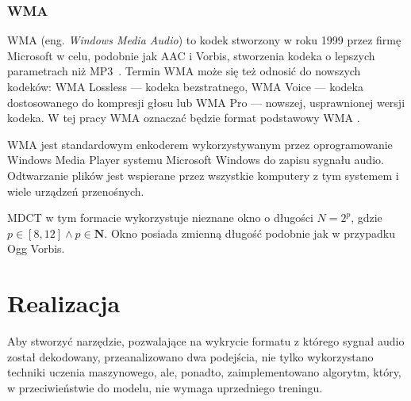 \documentclass[pl,12pt]{aghdpl}
\let\Oldchapter\chapter%
\renewcommand{\chapter}{\FloatBarrier\Oldchapter}
\let\Oldsubsection\subsection%
\renewcommand{\subsection}{\FloatBarrier\Oldsubsection}
\begin{document}
\subsection{WMA}

WMA (eng. \textit{Windows Media Audio}) to kodek stworzony w roku 1999 przez
firmę Microsoft w celu, podobnie jak AAC i Vorbis, stworzenia kodeka o lepszych
parametrach niż MP3~\cite{AvelarMorrissetteForbesAlbert2008}. Termin WMA może
się też odnosić do nowszych kodeków: WMA Lossless --- kodeka bezstratnego, WMA
Voice --- kodeka dostosowanego do kompresji głosu lub WMA Pro --- nowszej,
usprawnionej wersji kodeka. W tej pracy WMA oznaczać będzie format podstawowy
WMA .

WMA jest standardowym enkoderem wykorzystywanym przez oprogramowanie Windows
Media Player systemu Microsoft Windows do zapisu sygnału audio. Odtwarzanie
plików jest wspierane przez wszystkie komputery z tym systemem i wiele urządzeń
przenośnych.

MDCT w tym formacie wykorzystuje nieznane okno o długości $N = 2^p$, gdzie $p
\in [8,12] \land p \in\bm N$. Okno posiada zmienną długość podobnie jak w
przypadku Ogg Vorbis.

\chapter{Realizacja}
Aby stworzyć narzędzie, pozwalające na wykrycie formatu z którego sygnał audio
został dekodowany, przeanalizowano dwa podejścia, nie tylko wykorzystano
techniki uczenia maszynowego, ale, ponadto, zaimplementowano algorytm, który, w
przeciwieństwie do modelu, nie wymaga uprzedniego treningu.
\end{document}
